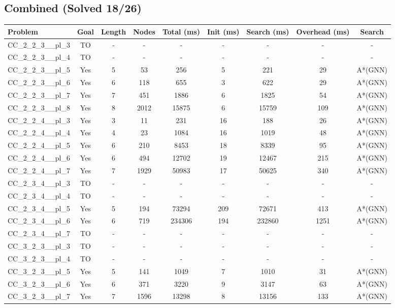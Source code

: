 \documentclass{article}
\begin{document}
\subsection*{Combined (Solved 18/26)}
\begin{tabular}{lcccccccc}
\toprule
Problem & Goal & Length & Nodes & Total (ms) & Init (ms) & Search (ms) & Overhead (ms) & Search \\
\midrule
CC\_2\_2\_3\_\_pl\_3 & TO & - & - & - & - & - & - & - \\
CC\_2\_2\_3\_\_pl\_4 & TO & - & - & - & - & - & - & - \\
CC\_2\_2\_3\_\_pl\_5 & Yes & 5 & 53 & 256 & 5 & 221 & 29 & A*(GNN) \\
CC\_2\_2\_3\_\_pl\_6 & Yes & 6 & 118 & 655 & 3 & 622 & 29 & A*(GNN) \\
CC\_2\_2\_3\_\_pl\_7 & Yes & 7 & 451 & 1886 & 6 & 1825 & 54 & A*(GNN) \\
CC\_2\_2\_3\_\_pl\_8 & Yes & 8 & 2012 & 15875 & 6 & 15759 & 109 & A*(GNN) \\
CC\_2\_2\_4\_\_pl\_3 & Yes & 3 & 11 & 231 & 16 & 188 & 26 & A*(GNN) \\
CC\_2\_2\_4\_\_pl\_4 & Yes & 4 & 23 & 1084 & 16 & 1019 & 48 & A*(GNN) \\
CC\_2\_2\_4\_\_pl\_5 & Yes & 6 & 210 & 8453 & 18 & 8339 & 95 & A*(GNN) \\
CC\_2\_2\_4\_\_pl\_6 & Yes & 6 & 494 & 12702 & 19 & 12467 & 215 & A*(GNN) \\
CC\_2\_2\_4\_\_pl\_7 & Yes & 7 & 1929 & 50983 & 17 & 50625 & 340 & A*(GNN) \\
CC\_2\_3\_4\_\_pl\_3 & TO & - & - & - & - & - & - & - \\
CC\_2\_3\_4\_\_pl\_4 & TO & - & - & - & - & - & - & - \\
CC\_2\_3\_4\_\_pl\_5 & Yes & 5 & 194 & 73294 & 209 & 72671 & 413 & A*(GNN) \\
CC\_2\_3\_4\_\_pl\_6 & Yes & 6 & 719 & 234306 & 194 & 232860 & 1251 & A*(GNN) \\
CC\_2\_3\_4\_\_pl\_7 & TO & - & - & - & - & - & - & - \\
CC\_3\_2\_3\_\_pl\_3 & TO & - & - & - & - & - & - & - \\
CC\_3\_2\_3\_\_pl\_4 & TO & - & - & - & - & - & - & - \\
CC\_3\_2\_3\_\_pl\_5 & Yes & 5 & 141 & 1049 & 7 & 1010 & 31 & A*(GNN) \\
CC\_3\_2\_3\_\_pl\_6 & Yes & 6 & 371 & 3220 & 9 & 3147 & 63 & A*(GNN) \\
CC\_3\_2\_3\_\_pl\_7 & Yes & 7 & 1596 & 13298 & 8 & 13156 & 133 & A*(GNN) \\

\end{tabular}
\end{document}
